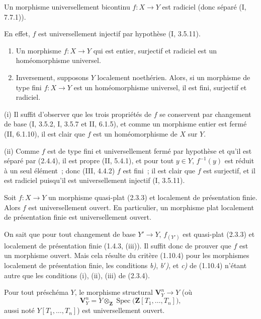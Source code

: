 \begin{proposition}[2.4.4]
\label{IV.2.4.4-fr}
Un morphisme universellement bicontinu $f:X\to Y$ est radiciel (donc séparé
(I, 7.7.1)).
\end{proposition}

En effet, $f$ est universellement injectif par hypothèse (I, 3.5.11).

\begin{proposition}[2.4.5]
\label{IV.2.4.5-fr}
\begin{enumerate}
\item[(i)] Un morphisme $f:X\to Y$ qui est entier, surjectif et radiciel est
un homéomorphisme universel.
\item[(ii)] Inversement, supposons $Y$ localement noethérien. Alors, si un
morphisme de type fini $f:X\to Y$ est un homéomorphisme universel, il est
fini, surjectif et radiciel.
\end{enumerate}
\end{proposition}

(i) Il suffit d'observer que les trois propriétés de $f$ se conservent par
changement de base (I, 3.5.2, I, 3.5.7 et II, 6.1.5), et comme un morphisme
entier est fermé (II, 6.1.10), il est clair que $f$ est un homéomorphisme de
$X$ sur $Y$.

(ii) Comme $f$ est de type fini et universellement fermé par hypothèse et
qu'il est séparé par (2.4.4), il est propre (II, 5.4.1), et pour tout
$y\in Y$, $f^{-1}(y)$ est réduit à un seul élément~; donc (III, 4.4.2) $f$
est fini~; il est clair que $f$ est surjectif, et il est radiciel puisqu'il
est universellement injectif (I, 3.5.11).

\begin{theorem}[2.4.6]
\label{IV.2.4.6-fr}
Soit $f:X\to Y$ un morphisme quasi-plat (2.3.3) et localement de présentation
finie. Alors $f$ est universellement ouvert. En particulier, un morphisme plat
localement de présentation finie est universellement ouvert.
\end{theorem}

On sait que pour tout changement de base $Y'\to Y$, $f_{(Y')}$ est
quasi-plat (2.3.3) et localement de présentation finie (1.4.3, (iii)). Il
suffit donc de prouver que $f$ est un
morphisme ouvert. Mais cela résulte du critère (1.10.4) pour les morphismes
localement de présentation finie, les conditions \emph{b)}, \emph{b$'$)}, et
\emph{c)} de (1.10.4) n'étant autre que les conditions (i), (ii), (iii) de
(2.3.4).

\begin{corollary}[2.4.7]
\label{IV.2.4.7-fr}
Pour tout préschéma $Y$, le morphisme structural $\mathbf V_Y^n\to Y$ (où
\[
\mathbf V_Y^n
=Y\otimes_{\mathbf Z}\operatorname{Spec}
  \bigl(\mathbf Z[T_1,\ldots,T_n]\bigr),
\]
aussi noté $Y[T_1,\ldots,T_n]$) est universellement ouvert.
\end{corollary}


